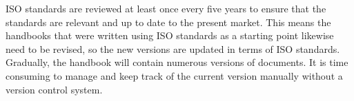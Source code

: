 ISO standards are reviewed at least once every five years to ensure that the standards are relevant and up to date to the present market. This means the handbooks that were written using ISO standards as a starting point likewise need to be revised, so the new versions are updated in terms of ISO standards. Gradually, the handbook will contain numerous versions of documents. It is time consuming to manage and keep track of the current version manually without a version control system. 


